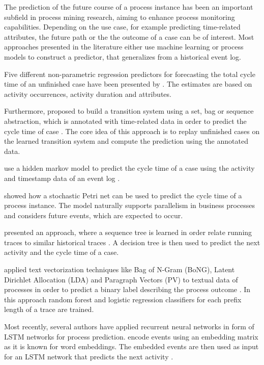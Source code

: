 
The prediction of the future course of a process instance has been an important subfield in process mining research, aiming to enhance process monitoring capabilities.
Depending on the use case, for example predicting time-related attributes, the future path or the the outcome of a case can be of interest.
Most approaches presented in the literature either use machine learning or process models to construct a predictor, that generalizes from a historical event log.

Five different non-parametric regression predictors for forecasting the total cycle time of an unfinished case have been presented by  \cite{DBLP:conf/otm/DongenCA08}.
The estimates are based on activity occurrences, activity duration and attributes.

Furthermore,  proposed to build a transition system using a set, bag or sequence abstraction, which is annotated with time-related data in order to predict the cycle time of case \cite{DBLP:journals/is/AalstSS11}.
The core idea of this approach is to replay unfinished cases on the learned transition system and compute the prediction using the annotated data.

\citeauthor{DBLP:conf/colcom/PandeyNC11} use a hidden markov model to predict the cycle time of a case using the activity and timestamp data of an event log \cite{DBLP:conf/colcom/PandeyNC11}.

\citeauthor{DBLP:conf/icsoc/Rogge-SoltiW13} showed how a stochastic Petri net can be used to predict the cycle time of a process instance.
The model naturally supports parallelism in business processes and considers future events, which are expected to occur. 

\citeauthor{DBLP:conf/dis/CeciLFCM14} presented an approach, where a sequence tree is learned in order relate running traces to similar historical traces \cite{DBLP:conf/dis/CeciLFCM14}.
A decision tree is then used to predict the next activity and the cycle time of a case.

\citeauthor{DBLP:conf/bpm/TeinemaaDMF16} applied text vectorization techniques like Bag of N-Gram (BoNG), Latent Dirichlet Allocation (LDA) and Paragraph Vectors (PV) to textual data of processes in order to predict a binary label describing the process outcome \cite{DBLP:conf/bpm/TeinemaaDMF16}.
In this approach random forest and logistic regression classifiers for each prefix length of a trace are trained.

Most recently, several authors have applied recurrent neural networks in form of LSTM networks for process prediction. \citeauthor{ DBLP:conf/bpm/EvermannRF16} encode events using an embedding matrix as it is known for word embeddings. The embedded events are then used as input for an LSTM network that predicts the next activity \cite{DBLP:conf/bpm/EvermannRF16}.

